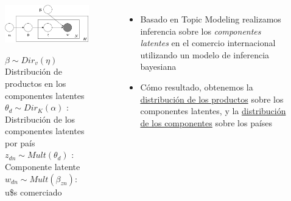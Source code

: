 \documentclass[compress]{beamer}
\begin{document}
\begin{frame}

\begin{columns}[c] 

\begin{figure}
\includegraphics[width=\linewidth]{grafo}

\medskip
\tiny
$\beta \sim Dir_v(\eta)$  Distribución de productos en los componentes latentes\\
$\theta_d \sim Dir_K(\alpha)$ : Distribución de los componentes latentes por país\\
$z_{dn} \sim Mult(\theta_d)$ : Componente latente \\
$w_{dn} \sim Mult(\beta_{zn})$: u\$s comerciado

\end{figure}

\small

\begin{itemize}

\item[\faRebel] Basado en Topic Modeling  \citep{blei2003latent} realizamos inferencia sobre los \textit{componentes latentes} en el comercio internacional utilizando un modelo de inferencia bayesiana
\item[\faRebel] Cómo resultado, obtenemos la \underline{distribución de los productos} sobre los componentes latentes, y la \underline{distribución de los componentes} sobre los países
\end{itemize}

\end{columns}
\end{frame}
\end{document}
